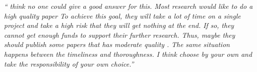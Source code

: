 \documentclass[12pt]{beamer}
\newcommand\ans[1]{{\it ``#1''}}
\begin{document}
\begin{frame}
  
\ans{ think no one could give a good answer for this.  Most research would like to do a high quality paper To achieve this goal, they will take a lot of time on a single project and take a high risk that they will get nothing at the end.  If so, they cannot get enough funds to support their further research.  Thus, maybe they should publish some papers that has moderate quality .  The same situation happens between the timeliness and thoroughness.   I  think  choose  by  your  own  and  take  the  responsibility  of  your  own choice.}




 



\end{frame}
\end{document}
